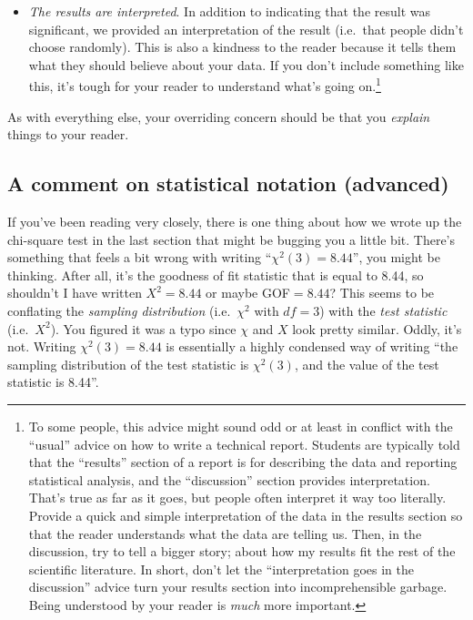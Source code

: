 \documentclass[
]{book}
\theoremstyle{definition}
\theoremstyle{definition}
\theoremstyle{definition}
\theoremstyle{definition}
\theoremstyle{remark}
\begin{document}
\begin{itemize}
\item
  \emph{The results are interpreted}. In addition to indicating that the result was significant, we provided an interpretation of the result (i.e.~that people didn't choose randomly). This is also a kindness to the reader because it tells them what they should believe about your data. If you don't include something like this, it's tough for your reader to understand what's going on.\footnote{To some people, this advice might sound odd or at least in conflict with the ``usual'' advice on how to write a technical report. Students are typically told that the ``results'' section of a report is for describing the data and reporting statistical analysis, and the ``discussion'' section provides interpretation. That's true as far as it goes, but people often interpret it way too literally. Provide a quick and simple interpretation of the data in the results section so that the reader understands what the data are telling us. Then, in the discussion, try to tell a bigger story; about how my results fit the rest of the scientific literature. In short, don't let the ``interpretation goes in the discussion'' advice turn your results section into incomprehensible garbage. Being understood by your reader is \emph{much} more important.}
\end{itemize}

As with everything else, your overriding concern should be that you \emph{explain} things to your reader.

\hypertarget{a-comment-on-statistical-notation-advanced}{%
\subsection{A comment on statistical notation (advanced)}\label{a-comment-on-statistical-notation-advanced}}

If you've been reading very closely, there is one thing about how we wrote up the chi-square test in the last section that might be bugging you a little bit. There's something that feels a bit wrong with writing ``\(\chi^2(3) = 8.44\)'', you might be thinking. After all, it's the goodness of fit statistic that is equal to 8.44, so shouldn't I have written \(X^2 = 8.44\) or maybe GOF\(=8.44\)? This seems to be conflating the \emph{sampling distribution} (i.e.~\(\chi^2\) with \(df = 3\)) with the \emph{test statistic} (i.e.~\(X^2\)). You figured it was a typo since \(\chi\) and \(X\) look pretty similar. Oddly, it's not. Writing \(\chi^2(3) = 8.44\) is essentially a highly condensed way of writing ``the sampling distribution of the test statistic is \(\chi^2(3)\), and the value of the test statistic is 8.44''.
\end{document}
